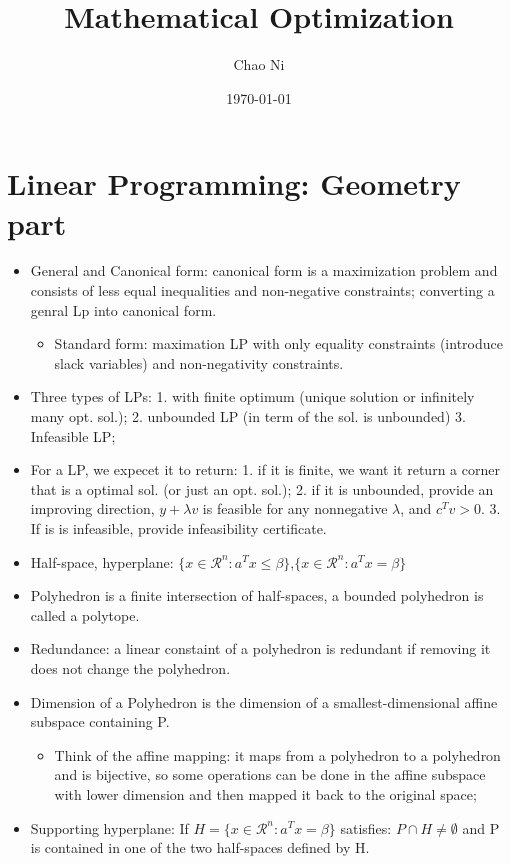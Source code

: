 \documentclass{article}
\title{Mathematical Optimization}
\author{Chao Ni}
\date{\today}
\begin{document}
\maketitle

\section{Linear Programming: Geometry part}
\begin{itemize}
\item General and Canonical form: canonical form is a maximization problem and consists of less equal inequalities and non-negative constraints; converting a genral Lp into canonical form.
\begin{itemize}
\item Standard form: maximation LP with only equality constraints (introduce slack variables) and non-negativity constraints.
\end{itemize}
\item Three types of LPs: 1. with finite optimum (unique solution or infinitely many opt. sol.); 2. unbounded LP (in term of the sol. is unbounded) 3. Infeasible LP; 
\item For a LP, we expecet it to return: 1. if it is finite, we want it return a corner that is a optimal sol. (or just an opt. sol.); 2. if it is unbounded, provide an improving direction, $y+\lambda v$ is feasible for any nonnegative $\lambda$, and $c^Tv>0$. 3. If is is infeasible, provide infeasibility certificate.
\item Half-space, hyperplane: $\{x\in \mathcal{R}^n: a^Tx\leq\beta\}$,$\{x\in \mathcal{R}^n: a^Tx=\beta\}$
\item Polyhedron is a finite intersection of half-spaces, a bounded polyhedron is called a polytope.
\item Redundance: a linear constaint of a polyhedron is redundant if removing it does not change the polyhedron.
\item Dimension of a Polyhedron is the dimension of a smallest-dimensional affine subspace containing P.
\begin{itemize}
\item Think of the affine mapping: it maps from a polyhedron to a polyhedron and is bijective, so some operations can be done in the affine subspace with lower dimension and then mapped it back to the original space;
\end{itemize}
\item Supporting hyperplane: If $H = \{x\in \mathcal{R}^n: a^Tx=\beta\}$ satisfies: $P\cap H\neq \emptyset$ and P is contained in one of the two half-spaces defined by H.

\end{itemize}
\end{document}
